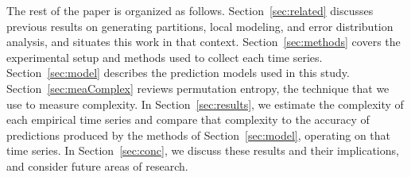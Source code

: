 

The rest of the paper is organized as follows.
Section~\ref{sec:related} discusses previous results on generating
partitions, local modeling, and error distribution analysis, and
situates this work in that context. Section~\ref{sec:methods} covers
the experimental setup and methods used to collect each time
series. Section~\ref{sec:model} describes the prediction models used
in this study.  Section~\ref{sec:meaComplex} reviews permutation
entropy, the technique that we use to measure complexity.  In
Section~\ref{sec:results}, we estimate the complexity of each
empirical time series and compare that complexity to the accuracy of
predictions produced by the methods of Section~\ref{sec:model},
operating on that time series.  In Section~\ref{sec:conc}, we discuss
these results and their implications, and consider future areas of
research.


